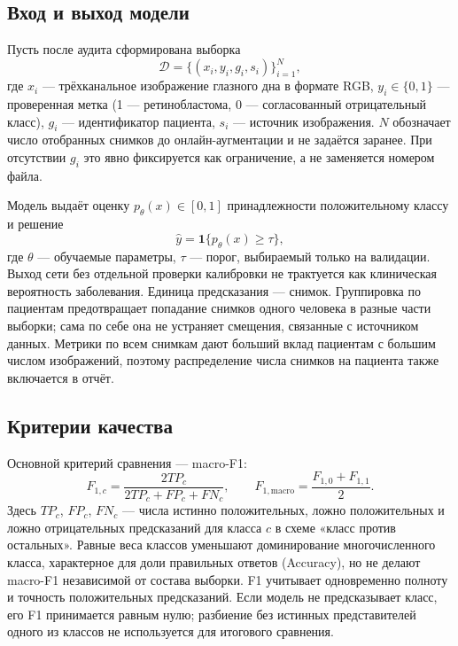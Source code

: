 \documentclass{misisarticle}
\begin{document}
\subsection{Вход и выход модели}
Пусть после аудита сформирована выборка
\begin{equation}
 \mathcal D=\{(x_i,y_i,g_i,s_i)\}_{i=1}^{N},
 \label{eq:data}
\end{equation}
где $x_i$ --- трёхканальное изображение глазного дна в формате RGB, $y_i\in\{0,1\}$ --- проверенная метка (1 --- ретинобластома, 0 --- согласованный отрицательный класс), $g_i$ --- идентификатор пациента, $s_i$ --- источник изображения. $N$ обозначает число отобранных снимков до онлайн-аугментации и не задаётся заранее. При отсутствии $g_i$ это явно фиксируется как ограничение, а не заменяется номером файла.

Модель выдаёт оценку $p_\theta(x)\in[0,1]$ принадлежности положительному классу и решение
\begin{equation}
 \widehat y=\mathbf{1}\{p_\theta(x)\geq\tau\},
 \label{eq:decision}
\end{equation}
где $\theta$ --- обучаемые параметры, $\tau$ --- порог, выбираемый только на валидации. Выход сети без отдельной проверки калибровки не трактуется как клиническая вероятность заболевания. Единица предсказания --- снимок. Группировка по пациентам предотвращает попадание снимков одного человека в разные части выборки; сама по себе она не устраняет смещения, связанные с источником данных. Метрики по всем снимкам дают больший вклад пациентам с большим числом изображений, поэтому распределение числа снимков на пациента также включается в отчёт.

\subsection{Критерии качества}
Основной критерий сравнения --- macro-F1:
\begin{equation}
 F_{1,c}=\frac{2TP_c}{2TP_c+FP_c+FN_c},\qquad
 F_{1,\mathrm{macro}}=\frac{F_{1,0}+F_{1,1}}{2}.
 \label{eq:macrof1}
\end{equation}
Здесь $TP_c$, $FP_c$, $FN_c$ --- числа истинно положительных, ложно положительных и ложно отрицательных предсказаний для класса $c$ в схеме «класс против остальных». Равные веса классов уменьшают доминирование многочисленного класса, характерное для доли правильных ответов (Accuracy), но не делают macro-F1 независимой от состава выборки. F1 учитывает одновременно полноту и точность положительных предсказаний. Если модель не предсказывает класс, его F1 принимается равным нулю; разбиение без истинных представителей одного из классов не используется для итогового сравнения.
\end{document}
